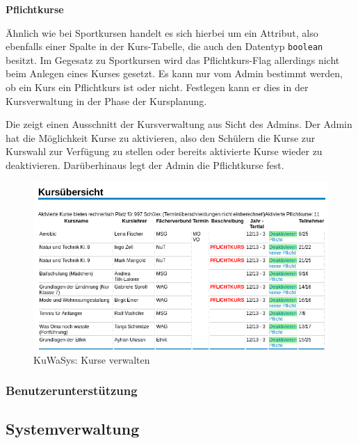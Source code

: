 \textbf{Pflichtkurse}

Ähnlich wie bei Sportkursen handelt es sich hierbei um ein Attribut, also ebenfalls einer Spalte in der Kurs-Tabelle, die auch den Datentyp \texttt{boolean} besitzt.
Im Gegesatz zu Sportkursen wird das Pflichtkurs-Flag allerdings nicht beim Anlegen eines Kurses gesetzt. Es kann nur vom Admin bestimmt werden, ob ein Kurs ein Pflichtkurs ist oder nicht. Festlegen kann er dies in der Kursverwaltung in der Phase der Kursplanung.

Die  zeigt einen Ausschnitt der Kursverwaltung aus Sicht des Admins.
Der Admin hat die Möglichkeit Kurse zu aktivieren, also den Schülern die Kurse zur Kurswahl zur Verfügung zu stellen oder bereits aktivierte Kurse wieder zu deaktivieren.
Darüberhinaus legt der Admin die Pflichtkurse fest.

\begin{figure}[H]
 \begin{center}
   \includegraphics[scale=0.6]{img/KursVerwalten_KuWaSys.png}
 \end{center}
 \caption[\textbf{KuWaSys: Kurse verwalten}]{KuWaSys: Kurse verwalten}
 \label{fig:KursVerwalten_KuWaSys}
\end{figure}

\subsubsection{Benutzerunterstützung}

\subsection{Systemverwaltung}
